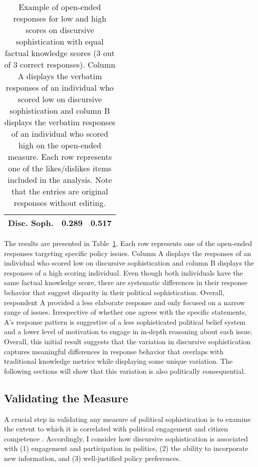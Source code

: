 \begin{table}[ht]
\begin{tabular}{l|p{6.8cm}|p{5.8cm}}
					\\\midrule
Disc. Soph. 		& 0.289
					& 0.517 
					\\\bottomrule
\end{tabular}
\caption[Example of open-ended responses for low and high scores on discursive sophistication]{Example of open-ended responses for low and high scores on discursive sophistication with equal factual knowledge scores (3 out of 3 correct responses). Column A displays the verbatim responses of an individual who scored low on discursive sophistication and column B displays the verbatim responses of an individual who scored high on the open-ended measure. Each row represents one of the likes/dislikes items included in the analysis. Note that the entries are original responses without editing.}\label{tab:ex1}
\end{table}

The results are presented in Table~\ref{tab:ex1}. Each row represents one of the open-ended responses targeting specific policy issues. Column A displays the responses of an individual who scored low on discursive sophistication and column B displays the responses of a high scoring individual. Even though both individuals have the same factual knowledge score, there are systematic differences in their response behavior that suggest disparity in their political sophistication. Overall, respondent A provided a less elaborate response and only focused on a narrow range of issues. Irrespective of whether one agrees with the specific statements, A's response pattern is suggestive of a less sophisticated political belief system and a lower level of motivation to engage in in-depth reasoning about each issue. Overall, this initial result suggests that the variation in discursive sophistication captures meaningful differences in response behavior that overlaps with traditional knowledge metrics while displaying some unique variation. The following sections will show that this variation is also politically consequential.




\subsection*{Validating the Measure}

A crucial step in validating any measure of political sophistication is to examine the extent to which it is correlated with political engagement and citizen competence \citep{lupia2006elitism,lupia2015uninformed}. Accordingly, I consider how discursive sophistication is associated with (1) engagement and participation in politics, (2) the ability to incorporate new information, and (3) well-justified policy preferences.


